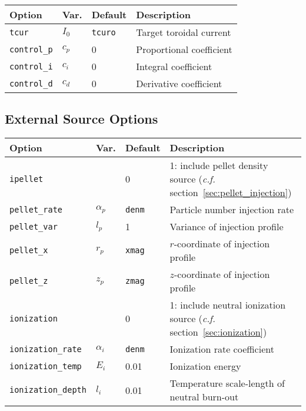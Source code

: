 \documentclass[draft]{book}
\begin{document}
\begin{tabular}{llll}
  \textbf{Option}&\textbf{Var.}&\textbf{Default}&\textbf{Description}\\
  \hline
  \texttt{tcur}       & $I_0$ & \texttt{tcuro} & Target toroidal current\\
  \texttt{control\_p} & $c_p$ & 0              & Proportional coefficient\\
  \texttt{control\_i} & $c_i$ & 0              & Integral coefficient\\
  \texttt{control\_d} & $c_d$ & 0              & Derivative coefficient\\
\end{tabular}


\subsection{External Source Options}

\begin{tabular}{llll}
  \textbf{Option}&\textbf{Var.}&\textbf{Default}&\textbf{Description}\\
  \hline
  \texttt{ipellet}      & & 0    & \parbox[t]{2in}{1: include pellet density
    source (\textit{c.f.} section~\ref{sec:pellet_injection})}\\
  \texttt{pellet\_rate} & $\alpha_p$ & \texttt{denm} 
                                     & Particle number injection rate\\
  \texttt{pellet\_var}  & $l_p$      & 1    & Variance of  
                                              injection profile\\
  \texttt{pellet\_x}    & $r_p$      & \texttt{xmag} 
                                     & $r$-coordinate of injection profile\\
  \texttt{pellet\_z}    & $z_p$      & \texttt{zmag} 
                                     & $z$-coordinate of injection profile\\
  \texttt{ionization}   & & 0  & \parbox[t]{2in}{1: include neutral ionization
    source (\textit{c.f.} section~\ref{sec:ionization})}\\
  \texttt{ionization\_rate} & $\alpha_i$ & \texttt{denm} 
                                     & Ionization rate coefficient\\
  \texttt{ionization\_temp} & $E_i$   & 0.01 & Ionization energy\\
  \texttt{ionization\_depth}& $l_i$   & 0.01 & \parbox[t]{2in}{Temperature 
    scale-length of neutral burn-out}
\end{tabular}
\end{document}
